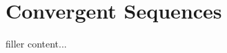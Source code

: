 \documentclass[../../templates/section]{subfiles}
\begin{document}
\section{Convergent Sequences}\label{sec:convergent-sequences}

filler content...
\end{document}

